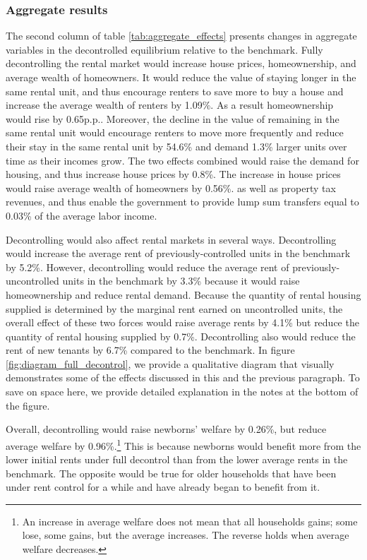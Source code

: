 \documentclass[parskip=full]{article}
\begin{document}
\subsubsection{Aggregate results} The second column of table \ref{tab:aggregate_effects} presents changes in aggregate variables in the decontrolled equilibrium relative to the benchmark. Fully decontrolling the rental market would increase house prices, homeownership, and average wealth of homeowners. It would reduce the value of staying longer in the same rental unit, and thus encourage renters to save more to buy a house and increase the average wealth of renters by 1.09\%. As a result homeownership would rise by 0.65p.p.. Moreover, the decline in the value of remaining in the same rental unit would encourage renters to move more frequently and reduce their stay in the same rental unit by 54.6\% and demand 1.3\% larger units over time as their incomes grow. The two effects combined would raise the demand for housing, and thus increase house prices by 0.8\%. The increase in house prices would raise average wealth of homeowners by 0.56\%. as well as property tax revenues, and thus enable the government to provide lump sum transfers equal to 0.03\% of the average labor income. 

Decontrolling would also affect rental markets in several ways. Decontrolling would increase the average rent of previously-controlled units in the benchmark by 5.2\%. However, decontrolling would reduce the average rent of previously-uncontrolled units in the benchmark by 3.3\% because it would raise homeownership and reduce rental demand. Because the quantity of rental housing supplied is determined by the marginal rent earned on uncontrolled units, the overall effect of these two forces would raise average rents by 4.1\% but reduce the quantity of rental housing supplied by 0.7\%. Decontrolling also would reduce the rent of new tenants by 6.7\% compared to the benchmark. In figure \ref{fig:diagram_full_decontrol}, we provide a qualitative diagram that visually demonstrates some of the effects discussed in this and the previous paragraph. To save on space here, we provide detailed explanation in the notes at the bottom of the figure.

Overall, decontrolling would raise newborns' welfare by 0.26\%, but reduce average welfare by 0.96\%.\footnote{An increase in average welfare does not mean that all households gains; some lose, some gains, but the average increases. The reverse holds when average welfare decreases.} This is because newborns would benefit more from the lower initial rents under full decontrol than from the lower average rents in the benchmark. The opposite would be true for older households that have been under rent control for a while and have already began to benefit from it. 
\end{document}
